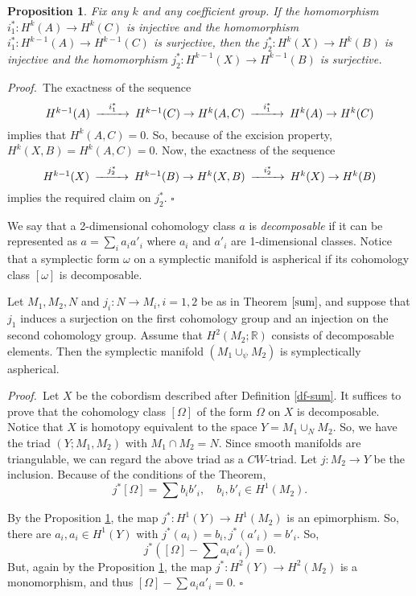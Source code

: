 \documentclass[12pt, twoside]{amsart}
\theoremstyle{plain}
\newtheorem{prop}[theorem]{Proposition}
\theoremstyle{definition}
\numberwithin{equation}{section}
\def\RR{\mathbb R}
\def\hqed{\hfill\hfill$\square$}
\def\RR{\mathbb R}
\def\m{\medskip}
\def\p{{\it Proof.\ }}
\begin{document}
\begin{prop}\label{mv}
 Fix any $k$ and any coefficient group. If the homomorphism $i_1^*: H^k(A) \to 
H^k(C)$ is injective and the homomorphism $i_1^*: H^{k-1}(A) \to H^{k-1}(C)$ 
is 
surjective, then the $j_2^*: H^k(X) \to H^k(B)$ is injective and the 
homomorphism $j_2^*: H^{k-1}(X) \to H^{k-1}(B)$ is surjective.
\end{prop}

\p The exactness of the sequence
$$
\CD
H^{k-1}(A) @>i_1^*>> H^{k-1}(C) \to H^{k}(A,C) @>i_1^*>> H^k(A) \to H^k(C)
\endCD
$$
implies that $H^{k}(A,C)=0$. So, because of the excision property, 
$H^{k}(X,B)= H^{k}(A,C)=0$. Now, the exactness of the sequence
$$
\CD
H^{k-1}(X) @>j_2^*>> H^{k-1}(B) \to H^{k}(X,B) @>i_2^*>> H^k(X) \to H^k(B)
\endCD
$$
implies the required claim on $j_2^*$.
\hqed
 
\m We say that a 2-dimensional cohomology class $a$ is {\it decomposable} if 
it can be represented as $a=\sum_i a_i a'_i$ where $a_i$ and $a'_i$ are 
1-dimensional classes. Notice that a symplectic form $\omega$ on a symplectic 
manifold is aspherical if its cohomology class $[\omega]$ is decomposable.

\begin{theorem} Let $M_1,M_2,N$ and $j_i: N \to M_i, i=1,2$ be as in Theorem 
$\ref{sum}$, and suppose that $j_1$ induces a surjection 
on the first cohomology group and an injection on the second cohomology group.  
Assume that $H^2(M_2;\RR)$ consists of decomposable elements.
Then the symplectic manifold $(M_1\cup_{\psi}M_2)$ is symplectically 
aspherical. 
\end{theorem}

\p Let $X$ be the cobordism described after Definition \ref{df-sum}. It 
suffices to prove that the cohomology class $[\Omega]$ of the form $\Omega$ on 
$X$ is decomposable. Notice that $X$ is homotopy equivalent to the space 
$Y=M_1\cup _N  M_2$. So, we have the triad $(Y; M_1, M_2)$ with $M_1 \cap 
M_2=N$. 
Since smooth  manifolds are triangulable, we can regard the above triad as a 
$CW$-triad. Let $j: M_2 \to Y$ be the inclusion. Because of the conditions of 
the Theorem, 
$$
j^*[\Omega]=\sum b_i b'_i, \quad b_i, b'_i \in H^1(M_2).
$$

By the Proposition \ref{mv}, the map $j^*:H^1(Y) \to H^1(M_2)$ is an 
epimorphism. So, 
there are $a_i, a_i\in H^1(Y)$ with $j^*(a_i)=b_i, j^*(a'_i)=b'_i$. So, 
$$
j^*([\Omega] - \sum a_i a'_i)=0.
$$ 
But, again by the Proposition \ref{mv}, the 
map $j^*:H^2(Y) \to H^2(M_2)$ is a monomorphism, and thus $[\Omega] - \sum a_i 
a'_i=0$.
\hqed
\end{document}
